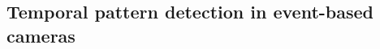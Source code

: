 \documentclass[brainsci, %
               review,submit,pdftex,moreauthors
               ]{Definitions/mdpi}
\begin{document}







\subsection{Temporal pattern detection in event-based cameras}
\end{document}
